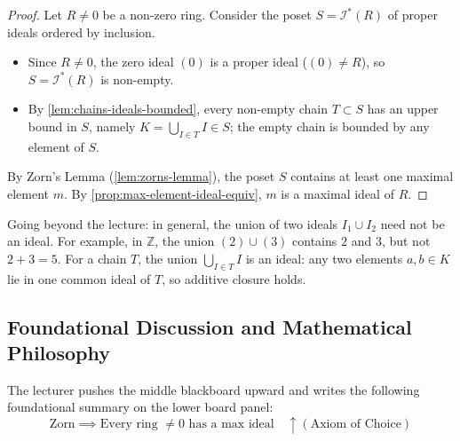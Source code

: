 \begin{content}
\begin{proof}
Let $R \neq 0$ be a non-zero ring. Consider the poset $S = \mathscr{I}^*(R)$ of proper ideals ordered by inclusion.
\begin{itemize}
    \item Since $R \neq 0$, the zero ideal $(0)$ is a proper ideal ($(0) \neq R$), so $S = \mathscr{I}^*(R)$ is non-empty.
    \item By \cref{lem:chains-ideals-bounded}, every non-empty chain $T \subset S$ has an upper bound in $S$, namely $K = \bigcup_{I \in T} I \in S$; the empty chain is bounded by any element of $S$.
\end{itemize}
By Zorn's Lemma (\cref{lem:zorns-lemma}), the poset $S$ contains at least one maximal element $m$. By \cref{prop:max-element-ideal-equiv}, $m$ is a maximal ideal of $R$.
\end{proof}

\begin{steps}
Going beyond the lecture: in general, the union of two ideals $I_1 \cup I_2$ need not be an ideal. For example, in $\mathbb{Z}$, the union $(2) \cup (3)$ contains $2$ and $3$, but not $2 + 3 = 5$.
For a chain $T$, the union $\bigcup_{I \in T} I$ is an ideal: any two elements $a, b \in K$ lie in one common ideal of $T$, so additive closure holds.
\end{steps}
\end{content}

\subsection{Foundational Discussion and Mathematical Philosophy}

\begin{note}
The lecturer pushes the middle blackboard upward and writes the following foundational summary on the lower board panel:
\[
\text{Zorn} \implies \text{Every ring } \neq 0 \text{ has a max ideal} \quad \uparrow (\text{Axiom of Choice})
\]
\end{note}

